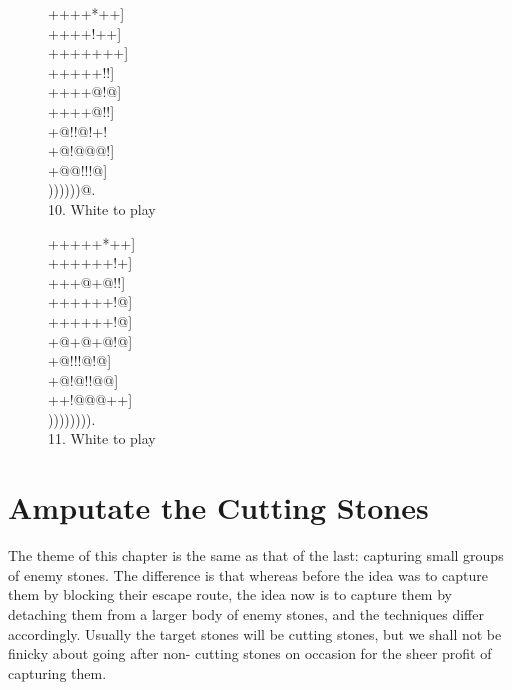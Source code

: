 \documentclass[mcrownvopaper,10pt,twopage,onecolumn,final]{memoir}
\begin{document}
\begin{figure}[ht]
    \begin{minipage}[c]{0.5\linewidth}
        \centering    
        {\gnos%
        ++++*++]\\
        ++++!++]\\
        +++++++]\\
        +++++!!]\\
        ++++@!@]\\
        ++++@!!]\\
        +@!!@!+!\\
        +@!@@@!]\\
        +@@!!!@]\\
        ))))))@.\\
        }
        10. White to play
    \end{minipage}%
    \begin{minipage}[c]{0.5\linewidth}
        \centering    
        {\gnos%
        +++++*++]\\
        ++++++!+]\\
        +++@+@!!]\\
        ++++++!@]\\
        ++++++!@]\\
        +@+@+@!@]\\
        +@!!!@!@]\\
        +@!@!!@@]\\
        ++!@@@++]\\
        )))))))).\\
        }
        11. White to play
    \end{minipage}
\end{figure}

\chapter{Amputate the Cutting Stones}
The theme of this chapter is the same as that of the last: capturing
small groups of enemy stones. The difference is that whereas before
the idea was to capture them by blocking their escape route, the idea
now is to capture them by detaching them from a larger body of enemy
stones, and the techniques differ accordingly. Usually the target stones
will be cutting stones, but we shall not be finicky about going after non-
cutting stones on occasion for the sheer profit of capturing them.
\end{document}

